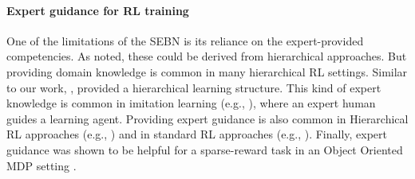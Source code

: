 \paragraph{Expert guidance for RL training}
One of the limitations of the SEBN is its reliance on the expert-provided competencies. 
As noted, these could be derived from hierarchical approaches. 
But providing domain knowledge is common in many hierarchical RL settings.
Similar to our work,  \citeauthor{patra2022hierarchical} \cite{patra2022hierarchical}, provided a hierarchical learning structure.
This kind of expert knowledge is common in  imitation learning (e.g., \cite{zhang19leveraging} \cite{hussein2017imitation} \cite{le2018hierarchical}), where an expert human guides a learning agent.
Providing expert guidance is also common in Hierarchical RL approaches (e.g., \cite{ahmadiTaylorStone07.aamas.IFSA}) and in standard RL approaches (e.g., \cite{andreas2017modular}).
Finally, expert guidance was shown to be helpful for a sparse-reward task in an Object Oriented MDP setting \cite{abelEtAl15.icaps.goalBasedActionPriors}.








